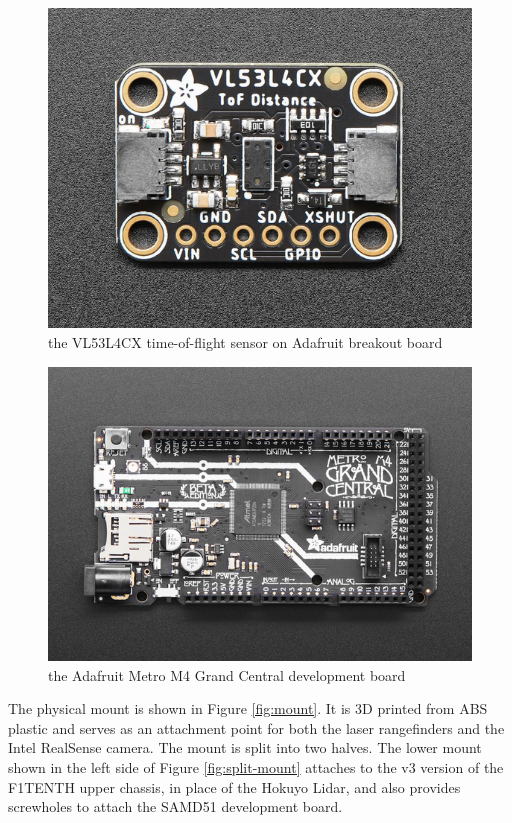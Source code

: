 \documentclass[conference]{IEEEtran}
\begin{document}
\begin{figure}
\centering
\includegraphics[scale=0.35]{vl53l4cx-adafruit.png}
\caption{the VL53L4CX time-of-flight sensor on Adafruit breakout board}
\label{fig:vl53l4cx}
\end{figure}

\begin{figure}
\centering
\includegraphics[scale=0.40]{grand-central.png}
\caption{the Adafruit Metro M4 Grand Central development board}
\label{fig:grand-central}
\end{figure}

The physical mount is shown in Figure \ref{fig:mount}. It is 3D printed from
ABS plastic and serves as an attachment point for both the laser rangefinders
and the Intel RealSense camera. The mount is split into two halves. The lower
mount shown in the left side of Figure \ref{fig:split-mount} attaches to the v3
version of the F1TENTH upper chassis, in place of the Hokuyo Lidar, and also
provides screwholes to attach the SAMD51 development board.
\end{document}
